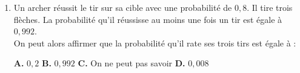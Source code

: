 \documentclass[a4paper,11pt]{article}
\begin{document}
\begin{seanceD}{}
\begin{enumerate}
\medskip
\begin{center}
\textbf{\textcolor{Couleur1}{A.}} $\left]-\infty\,;\,\dfrac{3}{4}\right[$ \qquad \textbf{\textcolor{Couleur1}{B.}} $\left]-\infty\,;\,\dfrac{4}{3}\right[$ \qquad \textbf{\textcolor{Couleur1}{C.}} $\left]\dfrac{3}{4}\,;\, +\infty\right[$ \qquad \textbf{\textcolor{Couleur1}{D.}} $\left]\dfrac{4}{3}\,;\, +\infty\right[$
\end{center}


\item Un archer réussit le tir sur sa cible avec une probabilité de $0{,}8$. 
        Il tire trois flèches.
La probabilité qu'il réussisse au moins une fois un tir est égale à $0{,}992$.\\
On peut alors affirmer que la probabilité qu'il rate ses trois tirs est égale à :

\medskip
\begin{center}
\textbf{\textcolor{Couleur1}{A.}} $0{,}2$ \qquad \textbf{\textcolor{Couleur1}{B.}} $0{,}992$ \qquad \textbf{\textcolor{Couleur1}{C.}} On ne peut pas savoir \qquad \textbf{\textcolor{Couleur1}{D.}} $0{,}008$
\end{center}


\end{enumerate}

\end{seanceD}

\newpage
\end{document}
